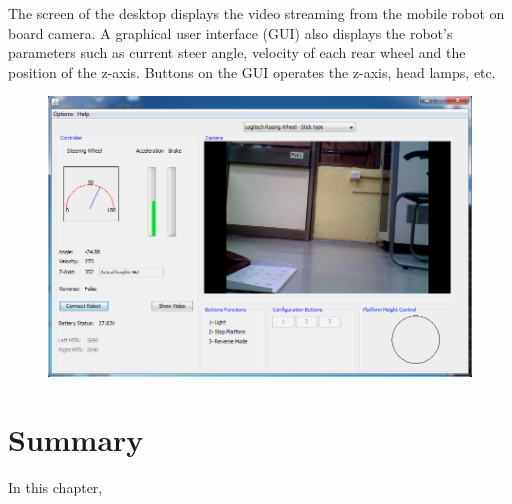 The screen of the desktop displays the video streaming  from the mobile robot on board camera. A graphical user  interface (GUI) also displays the robot's parameters such as current steer angle, velocity of each rear wheel and the position of the z-axis. Buttons on the GUI operates the z-axis, head lamps, etc.

\begin{figure}
	\includegraphics[width=\linewidth,keepaspectratio]{Chapter5/fig/gui}
	\label{fig:Gui} 
\end{figure}



\section{Summary}
In this chapter, 